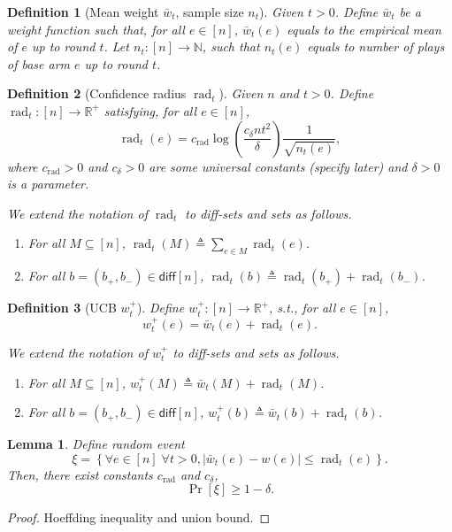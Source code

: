\documentclass{article}
\newtheorem{define}{Definition}
\newtheorem{lemma}{Lemma}
\newcommand{\diff}{\mathsf{diff}}
\newcommand{\RR}{\mathbb R}
\DeclareMathOperator{\rad}{rad}
\begin{document}
\begin{spacing}{1.1}
\begin{define}[Mean weight $\bar w_t$, sample size $n_t$]
Given $t>0$. 
Define $\bar w_t$ be a weight function such that, for all $e\in[n]$, $\bar w_t(e)$ equals to the empirical mean of $e$ up to round $t$.
Let $n_t: [n] \rightarrow \mathbb N$, such that $n_t(e)$ equals to number of plays of base arm $e$ up to round $t$.
\end{define}

\begin{define}[Confidence radius $\rad_t$]
Given $n$ and $t>0$.
Define $\rad_t:[n]\rightarrow \RR^+$ satisfying, for all $e\in[n]$,
$$
\rad_t(e) = c_{\rad}\log\left(\frac{c_\delta nt^2}\delta\right)\frac{1}{\sqrt{n_t(e)}},
$$
where $c_{\rad} > 0$  and $c_\delta>0$ are some universal constants (specify later) and $\delta > 0$ is a parameter.

We extend the notation of $\rad_t$ to diff-sets and sets as follows.
\begin{enumerate}
\item For all $M \subseteq [n]$, $\rad_t(M) \triangleq \sum_{e\in M} \rad_t(e)$.
\item For all $b=(b_+,b_-)\in \diff[n]$, $\rad_t(b) \triangleq \rad_t(b_+)+\rad_t(b_-)$.
\end{enumerate}

\end{define}

\begin{define}[UCB $w_t^+$]
Define $w^+_t: [n] \rightarrow \RR^+$, s.t., for all $e\in[n]$,  
$$ w^+_t(e)=\bar w_t(e)+\rad_t(e).$$

We extend the notation of $w_t^+$ to diff-sets and sets as follows.
\begin{enumerate}
\item For all $M \subseteq [n]$, $w_t^+(M) \triangleq \bar w_t(M)+\rad_t(M)$.
\item For all $b=(b_+,b_-)\in \diff[n]$, $w_t^+(b) \triangleq \bar w_t(b)+\rad_t(b)$.
\end{enumerate}

\end{define}

\begin{lemma}
\label{lemma:conf}
Define random event 
$$
\xi = \left\{\forall e\in[n]\; \forall t>0, |\bar w_t(e)-w(e)|\le \rad_t(e) \right\}.
$$
Then, there exist constants $c_{\rad}$ and $c_\delta$,
$$
\Pr[\xi] \ge 1-\delta.
$$
\end{lemma}
\begin{proof}
Hoeffding inequality and union bound.
\end{proof}


\end{spacing}
\end{document}
